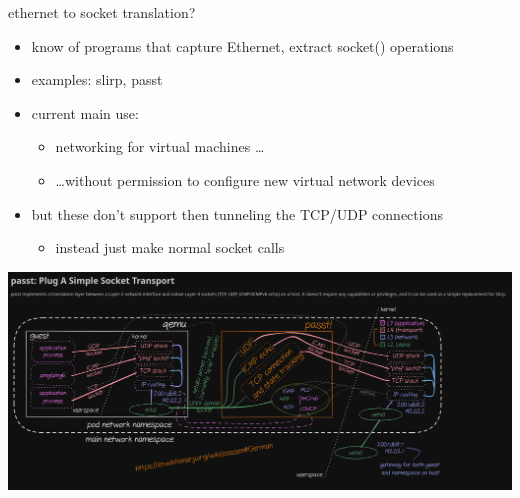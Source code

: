 \begin{frame}{ethernet to socket translation?}
    \begin{itemize}
    \item know of programs that capture Ethernet, extract socket() operations
    \item examples: slirp, passt
    \item current main use:
        \begin{itemize}
        \item networking for virtual machines \ldots
        \item \ldots without permission to configure new virtual network devices
        \end{itemize}
    \vspace{.5cm}
    \item but these don't support then tunneling the TCP/UDP connections
        \begin{itemize}
        \item instead just make normal socket calls
        \end{itemize}
    \end{itemize}
\end{frame}

\begin{frame}
\includegraphics[width=\textwidth]{../encap/passt}
\end{frame}
